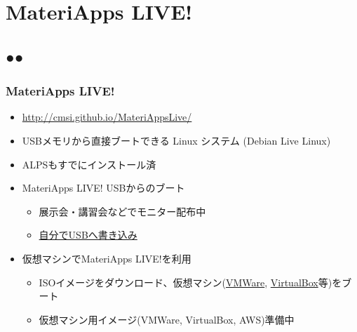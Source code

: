 \section{MateriApps LIVE!}
\subsection*{{\protect\color{red}●}{\protect\color{blue}●}}

\begin{frame}
 \frametitle{MateriApps LIVE!}
 \begin{itemize}
   \item \url{http://cmsi.github.io/MateriAppsLive/}
   \item USBメモリから直接ブートできる Linux システム (Debian Live Linux)
   \item ALPSもすでにインストール済
   \item MateriApps LIVE! USBからのブート
     \begin{itemize}
     \item 展示会・講習会などでモニター配布中
     \item \href{https://github.com/cmsi/MateriAppsLive/wiki/HowToMakeLiveUSB}{自分でUSBへ書き込み}
     \end{itemize}
   \item 仮想マシンでMateriApps LIVE!を利用
     \begin{itemize}
     \item ISOイメージをダウンロード、仮想マシン(\href{https://github.com/cmsi/MateriAppsLive/wiki/Using-MateriApps-LIVE!-by-VMWare}{VMWare}, \href{https://github.com/cmsi/MateriAppsLive/wiki/KnownProblems}{VirtualBox}等)をブート
     \item 仮想マシン用イメージ(VMWare, VirtualBox, AWS)準備中
     \end{itemize}
 \end{itemize}
\end{frame}


